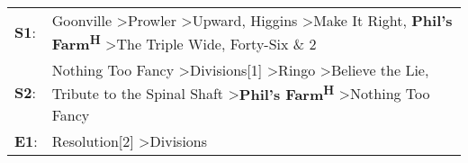 \begin{supertabular}{p{0.03\textwidth}p{0.92\textwidth}}
 \textbf{S1}:  &       Goonville\textsuperscript{} \textgreater \enspace Prowler\textsuperscript{} \textgreater \enspace Upward\textsuperscript{}, \enspace Higgins\textsuperscript{} \textgreater \enspace Make It Right\textsuperscript{}, \enspace \textbf{Phil's Farm\textsuperscript{H}} \textgreater \enspace The Triple Wide\textsuperscript{}, \enspace Forty-Six \& 2\textsuperscript{}  \enspace  \\
 \textbf{S2}:  &  Nothing Too Fancy\textsuperscript{} \textgreater \enspace Divisions[1]\textsuperscript{} \textgreater \enspace Ringo\textsuperscript{} \textgreater \enspace Believe the Lie\textsuperscript{}, \enspace Tribute to the Spinal Shaft\textsuperscript{} \textgreater \enspace \textbf{Phil's Farm\textsuperscript{H}} \textgreater \enspace Nothing Too Fancy\textsuperscript{}  \enspace  \\
 \textbf{E1}:  &                                                                                                                                                                                                                                                                                               Resolution[2]\textsuperscript{} \textgreater \enspace Divisions\textsuperscript{}  \enspace  \\
\end{supertabular}
